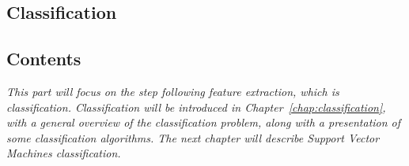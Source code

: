   \begin{titlepage}
    \vspace*{\fill}
      \part{Classification}
    \vspace*{\fill}
  \end{titlepage}

\startcontents[parts]

\chapter*{Contents}

\textit{This part will focus on the step following feature extraction, which is classification. Classification will be introduced in Chapter~\ref{chap:classification}, with a general overview of the classification problem, along with a presentation of some classification algorithms. The next chapter will describe Support Vector Machines classification.} 

\vspace{\baselineskip}


\pagebreak


\clearpage
\newpage


\stopcontents[parts]


